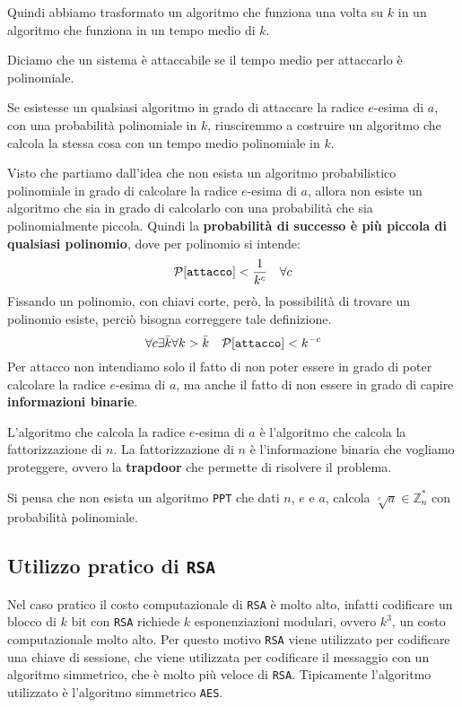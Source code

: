 Quindi abbiamo trasformato un algoritmo che funziona una volta su $k$ in un algoritmo
che funziona in un tempo medio di $k$.
\begin{tcolorbox}[title=Definizione di sicurezza]
  Diciamo che un sistema è attaccabile se il tempo medio per attaccarlo è polinomiale.
\end{tcolorbox}
Se esistesse un qualsiasi algoritmo in grado di attaccare la radice $e$-esima di $a$,
con una probabilità polinomiale in $k$, riusciremmo a costruire un algoritmo che calcola
la stessa cosa con un tempo medio polinomiale in $k$.

Visto che partiamo  dall'idea che non esista un algoritmo probabilistico polinomiale 
in grado di calcolare la radice $e$-esima di $a$, allora non esiste un algoritmo
che sia in grado di calcolarlo con una probabilità che sia polinomialmente piccola.
Quindi la \textbf{probabilità di successo è più piccola di qualsiasi polinomio}, dove per polinomio 
si intende:
\[
  \text{$\mathcal{P}$}[\texttt{attacco}] < \frac{1}{k^c}\quad \forall c
\]
Fissando un polinomio, con chiavi corte, però, la possibilità di trovare un polinomio esiste, 
perciò bisogna correggere tale definizione.
\begin{equation}
  \forall c \exists \bar{k} \forall k > \bar{k}\quad\text{$\mathcal{P}$}[\texttt{attacco}] < k^{-c}
\end{equation}
Per attacco non intendiamo solo il fatto di non poter essere in grado di poter calcolare la 
radice $e$-esima di $a$, ma anche il fatto di non essere in grado di capire 
\textbf{informazioni binarie}.

L'algoritmo che calcola la radice $e$-esima di $a$ è l'algoritmo che calcola 
la fattorizzazione di $n$. La fattorizzazione di $n$ è l'informazione 
binaria che vogliamo proteggere, ovvero la \textbf{trapdoor} che permette di risolvere 
il problema.
\begin{tcolorbox}[title=Fattorizzazione di $n$]
  Si pensa che non esista un algoritmo \texttt{PPT} che dati $n$, $e$ e $a$,
  calcola $\sqrt[e]{a} \in \mathbb{Z}_n^*$ con probabilità polinomiale.
\end{tcolorbox}
\subsection{Utilizzo pratico di \texttt{RSA}}

Nel caso pratico il costo computazionale di \texttt{RSA} è molto alto, infatti codificare 
un blocco di $k$ bit con \texttt{RSA} richiede $k$ esponenziazioni modulari, ovvero $k^3$, 
un costo computazionale molto alto. Per questo motivo \texttt{RSA} viene utilizzato per
codificare una chiave di sessione, che viene utilizzata per codificare
il messaggio con un algoritmo simmetrico, che è molto più veloce di \texttt{RSA}.
Tipicamente l'algoritmo utilizzato è l'algoritmo simmetrico \texttt{AES}.

